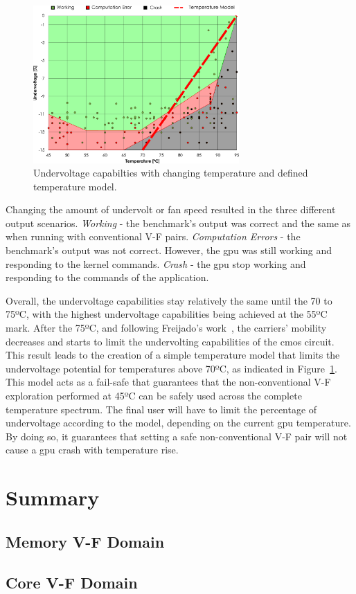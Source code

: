 \begin{figure}[htb]
    \centering
        \includegraphics[width=0.7\textwidth]{Figures/GPU_characterization/UndervoltageWithTemperature_new.pdf}
        \caption{Undervoltage capabilties with changing temperature and defined temperature model.}
    \label{fig:temp_model}
\end{figure}

Changing the amount of undervolt or fan speed resulted in the three different output scenarios. 
\textit{Working} - the benchmark's output was correct and the same as when running with conventional V-F pairs.
\textit{Computation Errors} - the benchmark's output was not correct. However, the \acrshort{gpu} was still working and responding to the kernel commands. \textit{Crash} - the \acrshort{gpu} stop working and responding to the commands of the application.

Overall, the undervoltage capabilities stay relatively the same until the 70 to 75ºC, with the highest undervoltage capabilities being achieved at the 55ºC mark. After the 75ºC, and following Freijado's work~\cite{freijedo_modeling_2012}, the carriers' mobility decreases and starts to limit the undervolting capabilities of the \acrshort{cmos} circuit. This result leads to the creation of a simple temperature model that limits the undervoltage potential for temperatures above 70ºC, as indicated in Figure~\ref{fig:temp_model}. This model acts as a fail-safe that guarantees that the non-conventional V-F exploration performed at 45ºC can be safely used across the complete temperature spectrum. The final user will have to limit the percentage of undervoltage according to the model, depending on the current \acrshort{gpu} temperature. By doing so, it guarantees that setting a safe non-conventional V-F pair will not cause a \acrshort{gpu} crash with temperature rise.




\section{Summary}


\subsection{Memory V-F Domain}
\label{section:memory}



\subsection{Core V-F Domain}
\label{section:core}